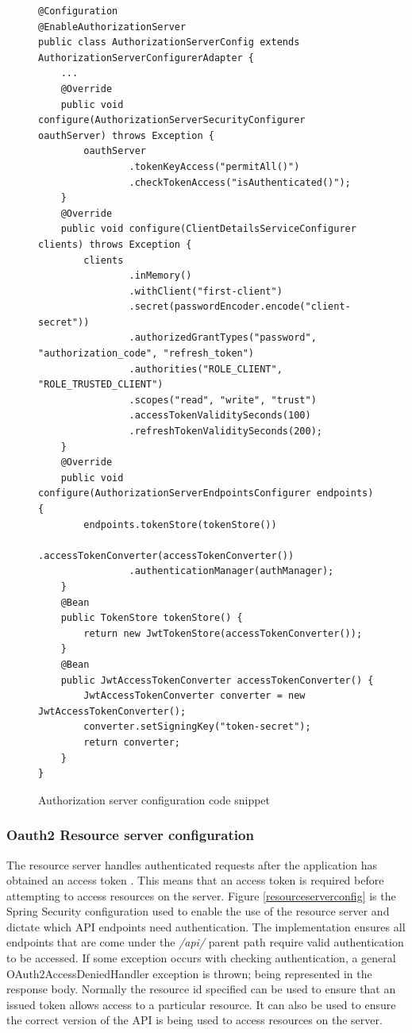\begin{figure}[ht]
    \centering
    \begin{lstlisting}
@Configuration
@EnableAuthorizationServer
public class AuthorizationServerConfig extends AuthorizationServerConfigurerAdapter {
    ...
    @Override
    public void configure(AuthorizationServerSecurityConfigurer oauthServer) throws Exception {
        oauthServer
                .tokenKeyAccess("permitAll()")
                .checkTokenAccess("isAuthenticated()");
    }
    @Override
    public void configure(ClientDetailsServiceConfigurer clients) throws Exception {
        clients
                .inMemory()
                .withClient("first-client")
                .secret(passwordEncoder.encode("client-secret"))
                .authorizedGrantTypes("password", "authorization_code", "refresh_token")
                .authorities("ROLE_CLIENT", "ROLE_TRUSTED_CLIENT")
                .scopes("read", "write", "trust")
                .accessTokenValiditySeconds(100)
                .refreshTokenValiditySeconds(200);
    }
    @Override
    public void configure(AuthorizationServerEndpointsConfigurer endpoints) {
        endpoints.tokenStore(tokenStore())
                .accessTokenConverter(accessTokenConverter())
                .authenticationManager(authManager);
    }
    @Bean
    public TokenStore tokenStore() {
        return new JwtTokenStore(accessTokenConverter());
    }
    @Bean
    public JwtAccessTokenConverter accessTokenConverter() {
        JwtAccessTokenConverter converter = new JwtAccessTokenConverter();
        converter.setSigningKey("token-secret");
        return converter;
    }
}
    \end{lstlisting}
    \caption{Authorization server configuration code snippet}
    \label{authorizationconfigsnippet}
\end{figure}


\clearpage
\subsubsection{Oauth2 Resource server configuration} \label{oauthresourcesection}
The resource server handles authenticated requests after the application has obtained an access token \cite{oauth2016resourceserver}.
This means that an access token is required before attempting to access resources on the server.
Figure \ref{resourceserverconfig} is the Spring Security configuration used to enable the use of the resource server and dictate which 
API endpoints need authentication.
The implementation ensures all endpoints that are come under the \textit{/api/} parent path require valid authentication to be accessed.
If some exception occurs with checking authentication, a general OAuth2AccessDeniedHandler exception is thrown; being represented in the
response body.
Normally the resource id specified can be used to ensure that an issued token allows access to a particular resource.
It can also be used to ensure the correct version of the API is being used to access resources on the server.



